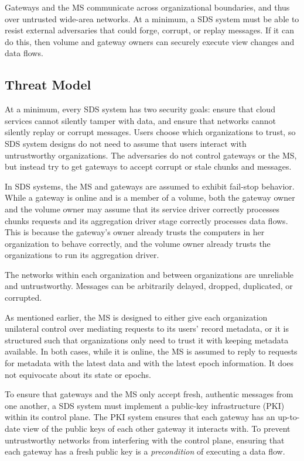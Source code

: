 Gateways and the MS communicate
across organizational boundaries, and thus over untrusted wide-area networks.
At a minimum, a SDS system must be able to resist external adversaries that could
forge, corrupt, or replay messages.  If it can do this, then volume and gateway owners can
securely execute view changes and data flows.

\subsection{Threat Model}

At a minimum, every SDS system has two security goals: ensure that cloud services
cannot silently tamper with data, and ensure that networks cannot silently replay
or corrupt messages.  Users choose which organizations to trust, so SDS system
designs do not need to assume that users interact with untrustworthy
organizations.  The adversaries do not control gateways or the MS, but
instead try to get gateways to accept corrupt or stale chunks and messages.

In SDS systems, the MS and gateways are assumed to exhibit fail-stop behavior.
While a gateway is online and is a member of a volume, both the gateway owner
and the volume owner may assume that its service driver
correctly processes chunks requests and its 
aggregation driver stage correctly processes data flows.  This is because the
gateway's owner already trusts the computers in her organization to behave
correctly, and the volume owner already trusts the organizations to run its
aggregation driver.

The networks within each organization and between organizations are unreliable
and untrustworthy.  Messages can be arbitrarily delayed, dropped, duplicated, or corrupted.

As mentioned earlier, the MS is designed to either give each organization
unilateral control over mediating requests to its users' record metadata, or it is structured such
that organizations only need to trust it with keeping metadata available.  In
both cases, while it is online, the MS is assumed to reply to requests for metadata with
the latest data and with the latest epoch information.  It does not equivocate
about its state or epochs.

To ensure that gateways and the MS only accept fresh, authentic messages from
one another, a SDS system must implement a public-key infrastructure (PKI) within
its control plane.  The PKI system ensures that each gateway has an up-to-date
view of the public keys of each other gateway it interacts with.  To prevent
untrustworthy networks from interfering with the control plane, ensuring
that each gateway has a fresh public key is a \emph{precondition} of executing a data
flow.

